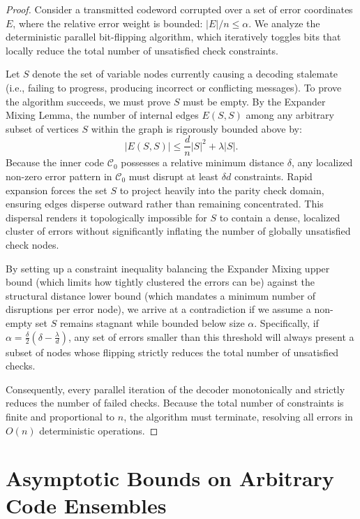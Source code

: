 \begin{proof}
Consider a transmitted codeword corrupted over a set of error coordinates $E$, where the relative error weight is bounded: $|E|/n \le \alpha$. We analyze the deterministic parallel bit-flipping algorithm, which iteratively toggles bits that locally reduce the total number of unsatisfied check constraints.

Let $S$ denote the set of variable nodes currently causing a decoding stalemate (i.e., failing to progress, producing incorrect or conflicting messages). To prove the algorithm succeeds, we must prove $S$ must be empty.
By the Expander Mixing Lemma, the number of internal edges $E(S, S)$ among any arbitrary subset of vertices $S$ within the graph is rigorously bounded above by:
\[
|E(S, S)| \le \frac{d}{n}|S|^2 + \lambda |S|.
\]
Because the inner code $\mathcal{C}_0$ possesses a relative minimum distance $\delta$, any localized non-zero error pattern in $\mathcal{C}_0$ must disrupt at least $\delta d$ constraints. Rapid expansion forces the set $S$ to project heavily into the parity check domain, ensuring edges disperse outward rather than remaining concentrated. This dispersal renders it topologically impossible for $S$ to contain a dense, localized cluster of errors without significantly inflating the number of globally unsatisfied check nodes.

By setting up a constraint inequality balancing the Expander Mixing upper bound (which limits how tightly clustered the errors can be) against the structural distance lower bound (which mandates a minimum number of disruptions per error node), we arrive at a contradiction if we assume a non-empty set $S$ remains stagnant while bounded below size $\alpha$. Specifically, if $\alpha = \frac{\delta}{2} (\delta - \frac{\lambda}{d})$, any set of errors smaller than this threshold will always present a subset of nodes whose flipping strictly reduces the total number of unsatisfied checks.

Consequently, every parallel iteration of the decoder monotonically and strictly reduces the number of failed checks. Because the total number of constraints is finite and proportional to $n$, the algorithm must terminate, resolving all errors in $O(n)$ deterministic operations.
\end{proof}

\section{Asymptotic Bounds on Arbitrary Code Ensembles}

